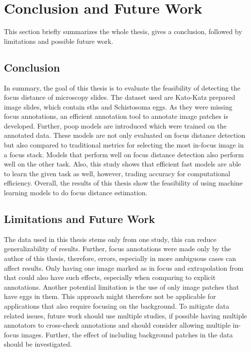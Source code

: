 \chapter{Conclusion and Future Work}
\label{ch:Conclusion}

This section briefly summarizes the whole thesis, gives a conclusion, followed by limitations and possible future work.

\section{Conclusion}
\label{sec:Conclusion:Conclusion}

In summary, the goal of this thesis is to evaluate the feasibility of detecting the focus distance of microscopy slides. The dataset used are Kato-Katz prepared image slides, which contain \aclp{sth} and Schistosoma eggs. As they were missing focus annotations, an efficient annotation tool to annotate image patches is developed. Further, \ac{poop} models are introduced which were trained on the annotated data. These models are not only evaluated on focus distance detection but also compared to traditional metrics for selecting the most in-focus image in a focus stack. Models that perform well on focus distance detection also perform well on the other task. Also, this study shows that efficient fast models are able to learn the given task as well, however, trading accuracy for computational efficiency.
Overall, the results of this thesis show the feasibility of using machine learning models to do focus distance estimation.


\section{Limitations and Future Work}
\label{sec:Conclusion:FutureWork}

The data used in this thesis stems only from one study, this can reduce generalizability of results. Further, focus annotations were made only by the author of this thesis, therefore, errors, especially in more ambiguous cases can affect results. Only having one image marked as in focus and extrapolation from that could also have such effects, especially when comparing to explicit annotations. Another potential limitation is the use of only image patches that have eggs in them. This approach might therefore not be applicable for applications that also require focusing on the background. 
To mitigate data related issues, future work should use multiple studies, if possible having multiple annotators to cross-check annotations and should consider allowing multiple in-focus images. Further, the effect of including background patches in the data should be investigated.

